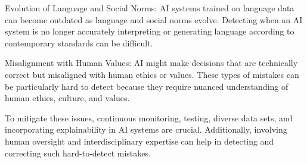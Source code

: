 \begin{aibox}
Evolution of Language and Social Norms: AI systems trained on language data can become outdated as language and social norms evolve. Detecting when an AI system is no longer accurately interpreting or generating language according to contemporary standards can be difficult.

Misalignment with Human Values: AI might make decisions that are technically correct but misaligned with human ethics or values. These types of mistakes can be particularly hard to detect because they require nuanced understanding of human ethics, culture, and values.

To mitigate these issues, continuous monitoring, testing, diverse data sets, and incorporating explainability in AI systems are crucial. Additionally, involving human oversight and interdisciplinary expertise can help in detecting and correcting such hard-to-detect mistakes.
\end{aibox}
\cbend
